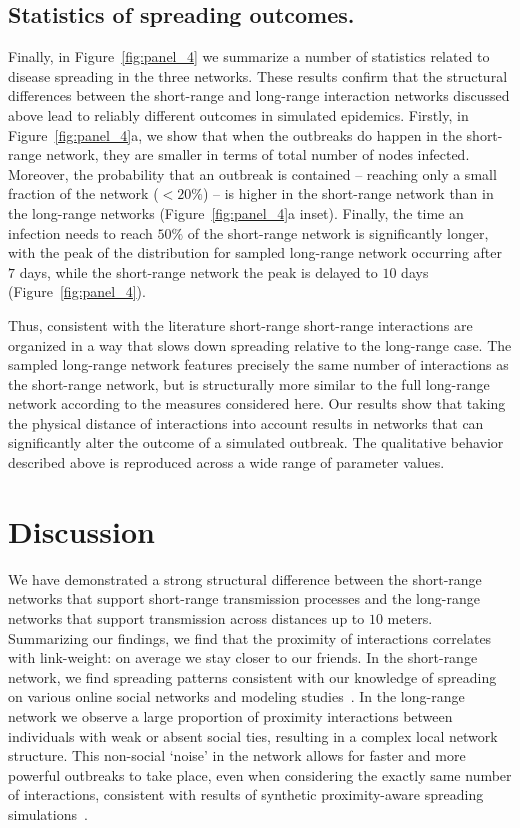 \documentclass[fleqn,10pt]{wlscirep}
\begin{document}
\subsection*{Statistics of spreading outcomes.}
Finally, in Figure~\ref{fig:panel_4} we summarize a number of statistics related to disease spreading in the three networks. 
These results confirm that the structural differences between the short-range and long-range interaction networks discussed above lead to reliably different outcomes in simulated epidemics.
Firstly, in Figure~\ref{fig:panel_4}a, we show that when the outbreaks do happen in the short-range network, they are smaller in terms of total number of nodes infected.
Moreover, the probability that an outbreak is contained -- reaching only a small fraction of the network ($< 20\%$) -- is higher in the short-range network than in the long-range networks (Figure~\ref{fig:panel_4}a inset).
Finally, the time an infection needs to reach $50\%$ of the short-range network is significantly longer, with the peak of the distribution for sampled long-range network occurring after $7$ days, while the short-range network the peak is delayed to $10$ days (Figure~\ref{fig:panel_4}).

Thus, consistent with the literature short-range short-range interactions are organized in a way that slows down spreading relative to the long-range case.
The sampled long-range network features precisely the same number of interactions as the short-range network, but is structurally more similar to the full long-range network according to the measures considered here. 
Our results show that taking the physical distance of interactions into account results in networks that can significantly alter the outcome of a simulated outbreak.
The qualitative behavior described above is reproduced across a wide range of parameter values.

\section*{Discussion}
 
We have demonstrated a strong structural difference between the short-range networks that support short-range transmission processes and the long-range networks that support transmission across distances up to $10$ meters.
Summarizing our findings, we find that the proximity of interactions correlates with link-weight: on average we stay closer to our friends.
In the short-range network, we find spreading patterns consistent with our knowledge of spreading on various online social networks and modeling studies~\cite{fowler2008dynamic, mucha2010community, salathe2010dynamics, karsai2011small, cauchemez2011role}. 
In the long-range network we observe a large proportion of proximity interactions between individuals with weak or absent social ties, resulting in a complex local network structure. 
This non-social `noise' in the network allows for faster and more powerful outbreaks to take place, even when considering the exactly same number of interactions, consistent with results of synthetic proximity-aware spreading simulations~\cite{sun2010effect}.
\end{document}
